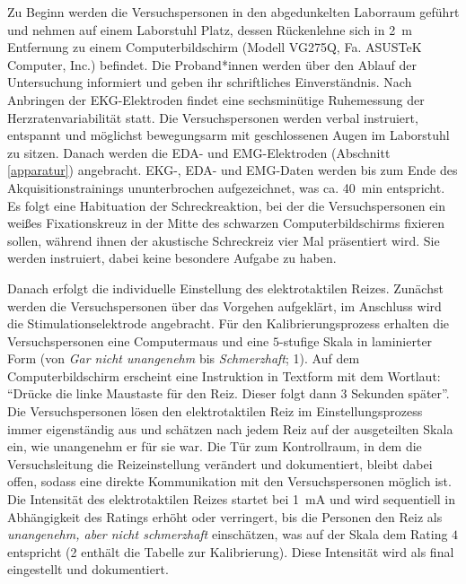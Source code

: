 						Zu Beginn werden die Versuchspersonen in den abgedunkelten Laborraum geführt und nehmen auf einem Laborstuhl Platz, dessen Rückenlehne sich in \SI{2}{\meter} %
						Entfernung zu einem Computerbildschirm (Modell VG275Q, Fa. ASUSTeK Computer, Inc.) befindet. Die Proband*innen werden über den Ablauf der Untersuchung informiert und geben ihr schriftliches Einverständnis. 	
						Nach Anbringen der EKG-Elektroden findet eine sechsminütige Ruhemessung der Herzratenvariabilität statt. Die Versuchspersonen werden verbal instruiert, entspannt und möglichst bewegungsarm mit geschlossenen Augen im Laborstuhl zu sitzen.
						Danach werden die EDA- und EMG-Elektroden (Abschnitt \ref{apparatur}) angebracht. EKG-, EDA- und EMG-Daten werden bis zum Ende des Akquisitionstrainings ununterbrochen aufgezeichnet, was ca. \SI{40}{\minute} entspricht.
						Es folgt eine Habituation der Schreckreaktion, bei der die Versuchspersonen ein weißes Fixationskreuz in der Mitte des schwarzen Computerbildschirms fixieren sollen, während ihnen der akustische Schreckreiz vier Mal präsentiert wird. Sie werden instruiert, dabei keine besondere Aufgabe zu haben. %
												
						Danach erfolgt die individuelle Einstellung des elektrotaktilen Reizes. Zunächst werden die Versuchspersonen über das Vorgehen aufgeklärt, im Anschluss wird die Stimulationselektrode angebracht. 						
						Für den Kalibrierungsprozess erhalten die Versuchspersonen eine Computermaus und eine $5$-stufige Skala in laminierter Form (von \textit{Gar nicht unangenehm} bis \textit{Schmerzhaft}; 1).
						Auf dem Computerbildschirm erscheint eine Instruktion in Textform mit dem Wortlaut: "`Drücke die linke Maustaste für den Reiz. Dieser folgt dann $3$ Sekunden später"'.
						Die Versuchspersonen lösen den elektrotaktilen Reiz im Einstellungsprozess immer eigenständig aus und schätzen nach jedem Reiz auf der ausgeteilten Skala ein, wie unangenehm er für sie war. Die Tür zum Kontrollraum, in dem die Versuchsleitung die Reizeinstellung verändert und dokumentiert, bleibt dabei offen, sodass eine direkte Kommunikation mit den Versuchspersonen möglich ist. 
						Die Intensität des elektrotaktilen Reizes startet bei \SI{1}{\milli\ampere} und wird sequentiell in Abhängigkeit des Ratings erhöht oder verringert, bis die Personen den Reiz als \textit{unangenehm, aber nicht schmerzhaft} einschätzen, was auf der Skala dem Rating $4$ entspricht (2 enthält die Tabelle zur Kalibrierung). Diese Intensität wird als final eingestellt und dokumentiert.
									

